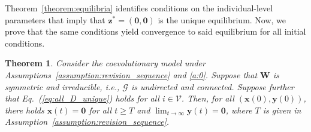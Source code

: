 \documentclass[letterpaper, 10 pt, conference]{ieeeconf}  %
\newcommand{\vect}[1]{\boldsymbol{#1}}
\newcommand{\mat}[1]{\boldsymbol{#1}}
\newtheorem{theorem}{Theorem}
\renewcommand{\eqref}[1]{Eq.~(\ref{#1})}  %
\begin{document}
Theorem~\ref{theorem:equilibria} identifies conditions on the individual-level parameters that imply that $\vect z^*=(\vect 0,\vect 0)$ is the unique equilibrium. Now, we prove that the same conditions yield convergence to said equilibrium for all initial conditions.
\begin{theorem}\label{theorem:convergence}
    Consider the coevolutionary model under Assumptions~\ref{assumption:revision_sequence} and \ref{a:0}. Suppose that $\mat W$ is symmetric and irreducible, i.e., $\mathcal G$ is undirected and connected. Suppose further that \eqref{eq:all_D_unique} holds for all $i\in\mathcal V$.
    Then, for all $(\vect x(0),\vect y(0))$, there holds $\vect x(t)=\vect 0$ for all $t\geq T$ and $\lim_{t\to\infty}\vect y(t)=\vect{0}$, where $T$ is given in Assumption~\ref{assumption:revision_sequence}.%
\end{theorem}
\end{document}
